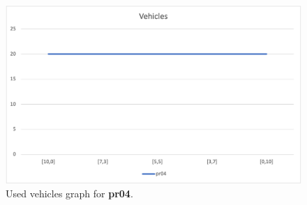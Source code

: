 \begin{figure}[H]
    \centering
    \includegraphics[height=0.25\textheight]{../graphs/pr04-vehicles.png}
    \caption{Used vehicles graph for \textbf{pr04}.}
\end{figure}

\newpage